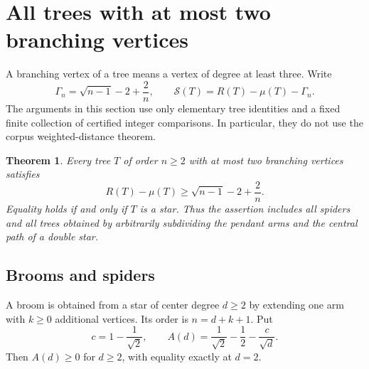 \documentclass[11pt,a4paper]{article}
\newtheorem{theorem}{Theorem}[section]
\theoremstyle{remark}\newtheorem{remark}[theorem]{Remark}
\begin{document}
\section{All trees with at most two branching vertices}
\label{sec:ch-two-branch}
A branching vertex of a tree means a vertex of degree at least three.
Write
\[
 \Gamma_n=\sqrt{n-1}-2+\frac2n,\qquad
 \mathcal S(T)=R(T)-\mu(T)-\Gamma_n.
\]
The arguments in this section use only elementary tree identities and a
fixed finite collection of certified integer comparisons. In particular,
they do not use the corpus weighted-distance theorem.

\begin{theorem}\label{thm:ch-two-branch}
Every tree $T$ of order $n\ge2$ with at most two branching vertices satisfies
\[
 R(T)-\mu(T)\ge\sqrt{n-1}-2+\frac2n.
\]
Equality holds if and only if $T$ is a star. Thus the assertion includes all
spiders and all trees obtained by arbitrarily subdividing the pendant arms
and the central path of a double star.
\end{theorem}

\subsection{Brooms and spiders}
A broom is obtained from a star of center degree $d\ge2$ by extending one
arm with $k\ge0$ additional vertices. Its order is $n=d+k+1$. Put
\[
 c=1-\frac1{\sqrt2},\qquad
 A(d)=\frac1{\sqrt2}-\frac12-\frac c{\sqrt d}.
\]
Then $A(d)\ge0$ for $d\ge2$, with equality exactly at $d=2$.
\end{document}
